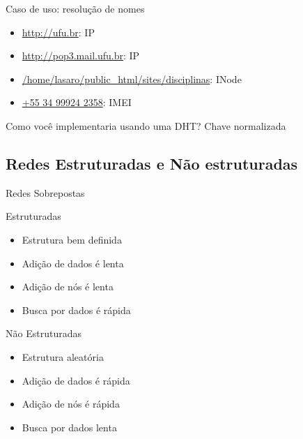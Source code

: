 \begin{frame}{Caso de uso: resolução de nomes}
\begin{itemize}
	\item \url{http://ufu.br}: IP
	\item \url{http://pop3.mail.ufu.br}: IP
	\item \url{/home/lasaro/public_html/sites/disciplinas}: INode
	\item \url{+55 34 99924 2358}: IMEI 
\end{itemize}

Como você implementaria usando uma DHT?
\pause
Chave normalizada
\end{frame}








\subsection[Estrutura]{Redes Estruturadas e Não estruturadas}

\begin{frame}{Redes Sobrepostas}
\begin{block}{Estruturadas}
	\begin{itemize}
		\item Estrutura bem definida
		\item Adição de dados é lenta
		\item Adição de nós é lenta
		\item Busca por dados é rápida
	\end{itemize}
\end{block}
\begin{block}{Não Estruturadas}
	\begin{itemize}
		\item Estrutura aleatória
		\item Adição de dados é rápida
		\item Adição de nós é rápida
		\item Busca por dados lenta
	\end{itemize}
\end{block}
\end{frame}


